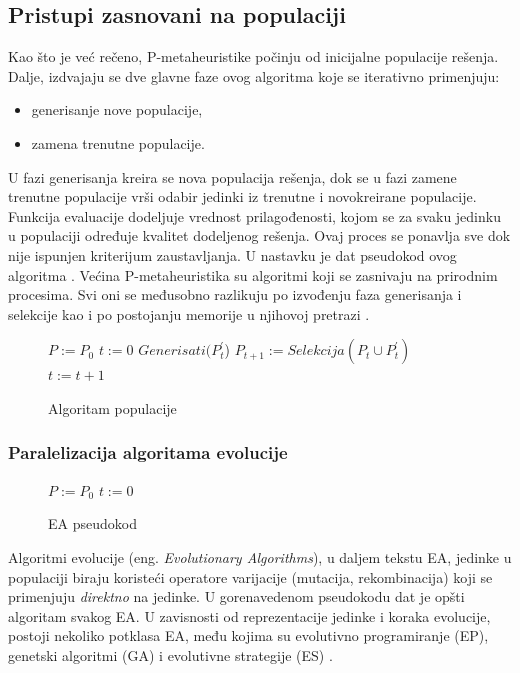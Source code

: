 \documentclass[a4paper]{article}
\newenvironment{algoritam}[1][htb]
{\renewcommand{\algorithmcfname}{Algoritam}
\begin{figure}[ht]
\centering
  \begin{minipage}{.75\linewidth}
	\begin{algorithm}[#1]%
  }{\end{algorithm}
  \end{minipage}
\end{figure}}
\begin{document}
\subsection{Pristupi zasnovani na populaciji}
\label{sec:OsnovnoPopulacija} 
Kao što je već rečeno, P-metaheuristike počinju od inicijalne populacije rešenja. Dalje, izdvajaju se dve glavne faze ovog algoritma koje se iterativno primenjuju: \cite{talbi}
\begin{itemize}
	\item generisanje nove populacije,
	\item zamena trenutne populacije.
\end{itemize} 

U fazi generisanja kreira se nova populacija rešenja, dok se u fazi zamene trenutne populacije vrši odabir jedinki iz trenutne i novokreirane populacije. Funkcija evaluacije dodeljuje vrednost prilagođenosti, kojom se za svaku jedinku u populaciji određuje kvalitet dodeljenog rešenja.
Ovaj proces se ponavlja sve dok nije ispunjen kriterijum zaustavljanja. U nastavku je dat pseudokod ovog algoritma \cite{talbi}.
\newpage \indent Većina P-metaheuristika su algoritmi koji se zasnivaju na prirodnim procesima. Svi oni se međusobno razlikuju po izvođenju faza generisanja i selekcije kao i po postojanju memorije u njihovoj pretrazi \cite{talbi}.

\begin{algoritam}[H]
\SetAlgoLined
 $P := P_0$\;
 $t := 0$\;
 {
    $Generisati(P_t^{'}$)\; 
    $P_{t+1} := Selekcija(P_t  \cup  P_t^{'})$\;
    $t := t + 1$\;
 }
\caption{Algoritam populacije} 
\end{algoritam}

\subsubsection{Paralelizacija algoritama evolucije}
\label{sec:ParalelizacijaEvolucije}
\begin{algoritam}[H]
\SetAlgoLined
 $P := P_0$\;
 $t := 0$\;
\caption{EA pseudokod}
\end{algoritam}

Algoritmi evolucije (eng. \textit{Evolutionary Algorithms}), u daljem tekstu EA, jedinke u populaciji biraju koristeći operatore varijacije (mutacija, rekombinacija) koji se primenjuju \textit{direktno} na jedinke. U gorenavedenom pseudokodu dat je opšti algoritam svakog EA. U zavisnosti od reprezentacije jedinke i koraka evolucije, postoji nekoliko potklasa EA, među kojima su evolutivno programiranje (EP), genetski algoritmi (GA) i evolutivne strategije (ES) \cite{alba}.
\end{document}
